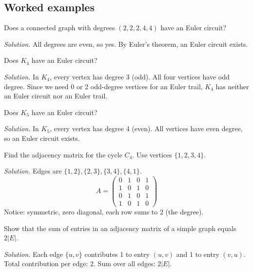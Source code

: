 \subsection*{Worked examples}

\begin{example}
Does a connected graph with degrees $(2, 2, 2, 4, 4)$ have an Euler circuit?

\emph{Solution.} All degrees are even, so yes. By Euler's theorem, an Euler circuit exists.
\end{example}

\begin{example}
Does $K_4$ have an Euler circuit?

\emph{Solution.} In $K_4$, every vertex has degree 3 (odd). All four vertices have odd degree. Since we need 0 or 2 odd-degree vertices for an Euler trail, $K_4$ has neither an Euler circuit nor an Euler trail.
\end{example}

\begin{example}
Does $K_5$ have an Euler circuit?

\emph{Solution.} In $K_5$, every vertex has degree 4 (even). All vertices have even degree, so an Euler circuit exists.
\end{example}

\begin{example}
Find the adjacency matrix for the cycle $C_4$. Use vertices $\{1, 2, 3, 4\}$.

\emph{Solution.} Edges are $\{1,2\}, \{2,3\}, \{3,4\}, \{4,1\}$.
\[
A = \begin{pmatrix}
0 & 1 & 0 & 1 \\
1 & 0 & 1 & 0 \\
0 & 1 & 0 & 1 \\
1 & 0 & 1 & 0
\end{pmatrix}
\]
Notice: symmetric, zero diagonal, each row sums to 2 (the degree).
\end{example}

\begin{example}
Show that the sum of entries in an adjacency matrix of a simple graph equals $2|E|$.

\emph{Solution.} Each edge $\{u, v\}$ contributes 1 to entry $(u, v)$ and 1 to entry $(v, u)$. Total contribution per edge: 2. Sum over all edges: $2|E|$.
\end{example}

